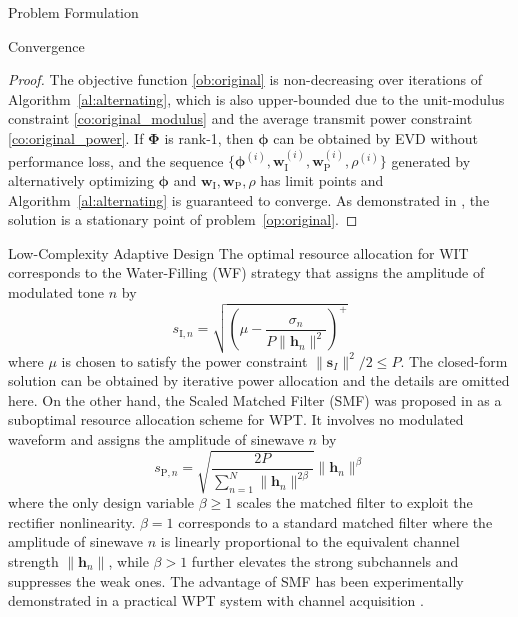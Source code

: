 \documentclass[journal]{IEEEtran}
\begin{document}
\begin{section}{Problem Formulation}
\begin{subsection}{Convergence}
			\begin{proof}\label{pf:ao}
				The objective function \eqref{ob:original} is non-decreasing over iterations of Algorithm~\ref{al:alternating}, which is also upper-bounded due to the unit-modulus constraint \eqref{co:original_modulus} and the average transmit power constraint \eqref{co:original_power}. If $\boldsymbol{\Phi}$ is rank-\num{1}, then $\boldsymbol{\phi}$ can be obtained by EVD without performance loss, and the sequence $\{\boldsymbol{\phi}^{(i)},\boldsymbol{w}_{\mathrm{I}}^{(i)},\boldsymbol{w}_{\mathrm{P}}^{(i)},\rho^{(i)}\}$ generated by alternatively optimizing $\boldsymbol{\phi}$ and $\boldsymbol{w}_{\mathrm{I}},\boldsymbol{w}_{\mathrm{P}},\rho$ has limit points and Algorithm~\ref{al:alternating} is guaranteed to converge. As demonstrated in \cite{Grippo2000}, the solution is a stationary point of problem~\eqref{op:original}.
			\end{proof}
		\end{subsection}

		\begin{subsection}{Low-Complexity Adaptive Design}
			The optimal resource allocation for WIT corresponds to the Water-Filling (WF) strategy that assigns the amplitude of modulated tone $n$ by
			\begin{equation}
				s_{\mathrm{I}, n} = \sqrt{\left(\mu - \frac{\sigma_n}{P \lVert{\boldsymbol{h}_n}\rVert^2}\right)^+}
			\end{equation}
			where $\mu$ is chosen to satisfy the power constraint $\lVert{\boldsymbol{s}_I}\rVert^2 / 2 \le P$. The closed-form solution can be obtained by iterative power allocation and the details are omitted here. On the other hand, the Scaled Matched Filter (SMF) was proposed in \cite{Clerckx2017} as a suboptimal resource allocation scheme for WPT. It involves no modulated waveform and assigns the amplitude of sinewave $n$ by
			\begin{equation}
				s_{\mathrm{P}, n} = \sqrt{\frac{2 P}{\sum_{n=1}^N \lVert{\boldsymbol{h}_n \rVert^{2 \beta}}}}\lVert{\boldsymbol{h}_n}\rVert^\beta
			\end{equation}
			where the only design variable $\beta \ge 1$ scales the matched filter to exploit the rectifier nonlinearity. $\beta = 1$ corresponds to a standard matched filter where the amplitude of sinewave $n$ is linearly proportional to the equivalent channel strength $\lVert{\boldsymbol{h}_n}\rVert$, while $\beta > 1$ further elevates the strong subchannels and suppresses the weak ones. The advantage of SMF has been experimentally demonstrated in a practical WPT system with channel acquisition \cite{Kim2017}.


\end{subsection}
\end{section}
\end{document}

